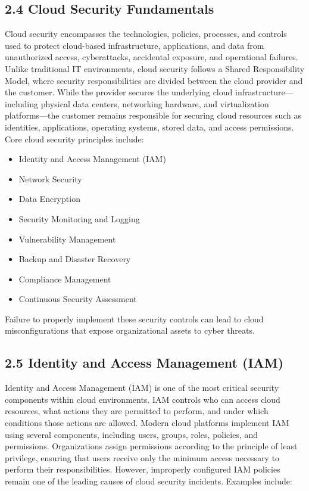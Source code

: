 \subsection{2.4 Cloud Security Fundamentals}

Cloud security encompasses the technologies, policies, processes, and controls used to protect cloud-based infrastructure, applications, and data from unauthorized access, cyberattacks, accidental exposure, and operational failures. Unlike traditional IT environments, cloud security follows a Shared Responsibility Model, where security responsibilities are divided between the cloud provider and the customer. While the provider secures the underlying cloud infrastructure---including physical data centers, networking hardware, and virtualization platforms---the customer remains responsible for securing cloud resources such as identities, applications, operating systems, stored data, and access permissions. Core cloud security principles include:

\begin{itemize}
\tightlist
\item
  Identity and Access Management (IAM)\\
\item
  Network Security\\
\item
  Data Encryption\\
\item
  Security Monitoring and Logging\\
\item
  Vulnerability Management\\
\item
  Backup and Disaster Recovery\\
\item
  Compliance Management\\
\item
  Continuous Security Assessment
\end{itemize}

Failure to properly implement these security controls can lead to cloud misconfigurations that expose organizational assets to cyber threats.

\subsection{2.5 Identity and Access Management (IAM)}

Identity and Access Management (IAM) is one of the most critical security components within cloud environments. IAM controls who can access cloud resources, what actions they are permitted to perform, and under which conditions those actions are allowed. Modern cloud platforms implement IAM using several components, including users, groups, roles, policies, and permissions. Organizations assign permissions according to the principle of least privilege, ensuring that users receive only the minimum access necessary to perform their responsibilities. However, improperly configured IAM policies remain one of the leading causes \cite{vanede2022iam} of cloud security incidents. Examples include:

